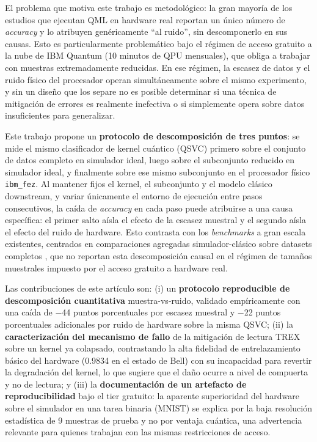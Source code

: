 \documentclass[conference]{IEEEtran}
\begin{document}
El problema que motiva este trabajo es metodológico: la gran mayoría de los estudios que ejecutan QML en hardware real reportan un único número de \textit{accuracy} y lo atribuyen genéricamente ``al ruido'', sin descomponerlo en sus causas. Esto es particularmente problemático bajo el régimen de acceso gratuito a la nube de IBM Quantum (10 minutos de QPU mensuales), que obliga a trabajar con muestras extremadamente reducidas. En ese régimen, la escasez de datos y el ruido físico del procesador operan simultáneamente sobre el mismo experimento, y sin un diseño que los separe no es posible determinar si una técnica de mitigación de errores es realmente inefectiva o si simplemente opera sobre datos insuficientes para generalizar.

Este trabajo propone un \textbf{protocolo de descomposición de tres puntos}: se mide el mismo clasificador de kernel cuántico (QSVC) primero sobre el conjunto de datos completo en simulador ideal, luego sobre el subconjunto reducido en simulador ideal, y finalmente sobre ese mismo subconjunto en el procesador físico \texttt{ibm\_fez}. Al mantener fijos el kernel, el subconjunto y el modelo clásico downstream, y variar únicamente el entorno de ejecución entre pasos consecutivos, la caída de \textit{accuracy} en cada paso puede atribuirse a una causa específica: el primer salto aísla el efecto de la escasez muestral y el segundo aísla el efecto del ruido de hardware. Esto contrasta con los \textit{benchmarks} a gran escala existentes, centrados en comparaciones agregadas simulador-clásico sobre datasets completos \cite{bowles2024,schnabel2024}, que no reportan esta descomposición causal en el régimen de tamaños muestrales impuesto por el acceso gratuito a hardware real.

Las contribuciones de este artículo son: (i) un \textbf{protocolo reproducible de descomposición cuantitativa} muestra-vs-ruido, validado empíricamente con una caída de $-$44 puntos porcentuales por escasez muestral y $-$22 puntos porcentuales adicionales por ruido de hardware sobre la misma QSVC; (ii) la \textbf{caracterización del mecanismo de fallo} de la mitigación de lectura TREX sobre un kernel ya colapsado, contrastando la alta fidelidad de entrelazamiento básico del hardware (0.9834 en el estado de Bell) con su incapacidad para revertir la degradación del kernel, lo que sugiere que el daño ocurre a nivel de compuerta y no de lectura; y (iii) la \textbf{documentación de un artefacto de reproducibilidad} bajo el tier gratuito: la aparente superioridad del hardware sobre el simulador en una tarea binaria (MNIST) se explica por la baja resolución estadística de 9 muestras de prueba y no por ventaja cuántica, una advertencia relevante para quienes trabajan con las mismas restricciones de acceso.
\end{document}
